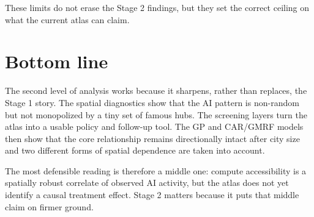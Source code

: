 \documentclass[11pt]{article}
\begin{document}
These limits do not erase the Stage 2 findings, but they set the correct ceiling on what the current atlas can claim.

\section{Bottom line}
The second level of analysis works because it sharpens, rather than replaces, the Stage 1 story. The spatial diagnostics show that the AI pattern is non-random but not monopolized by a tiny set of famous hubs. The screening layers turn the atlas into a usable policy and follow-up tool. The GP and CAR/GMRF models then show that the core relationship remains directionally intact after city size and two different forms of spatial dependence are taken into account.

The most defensible reading is therefore a middle one: compute accessibility is a spatially robust correlate of observed AI activity, but the atlas does not yet identify a causal treatment effect. Stage 2 matters because it puts that middle claim on firmer ground.
\end{document}
